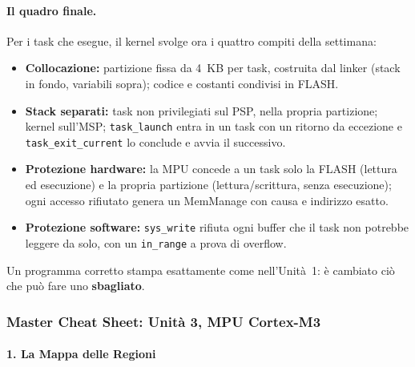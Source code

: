 \paragraph*{Il quadro finale.}
Per i task che esegue, il kernel svolge ora i quattro compiti della settimana:
\begin{itemize}
  \item \textbf{Collocazione:} partizione fissa da 4~KB per task, costruita dal linker (stack in
    fondo, variabili sopra); codice e costanti condivisi in FLASH.
  \item \textbf{Stack separati:} task non privilegiati sul PSP, nella propria partizione; kernel
    sull'MSP; \texttt{task\_launch} entra in un task con un ritorno da eccezione e
    \texttt{task\_exit\_current} lo conclude e avvia il successivo.
  \item \textbf{Protezione hardware:} la MPU concede a un task solo la FLASH (lettura ed
    esecuzione) e la propria partizione (lettura/scrittura, senza esecuzione); ogni accesso
    rifiutato genera un MemManage con causa e indirizzo esatto.
  \item \textbf{Protezione software:} \texttt{sys\_write} rifiuta ogni buffer che il task non
    potrebbe leggere da solo, con un \texttt{in\_range} a prova di overflow.
\end{itemize}
Un programma corretto stampa esattamente come nell'Unità~1: è cambiato ciò che può fare uno
\textbf{sbagliato}.


\subsubsection{Master Cheat Sheet: Unità 3, MPU Cortex-M3}

\paragraph*{1. La Mappa delle Regioni}

